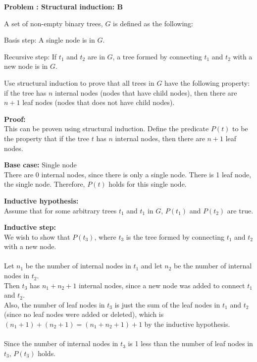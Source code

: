 \documentclass[leqno]{article}
\numberwithin{equation}{section}
\theoremstyle{definition}
\newcounter{parts}
\newcounter{problems}[parts]
\newcommand{\problem}[2]{\stepcounter{problems}
  {\Large \bf \noindent Problem \arabic{problems}: #1 \marginpar{[Total #2 pts]} \\[0.3cm]}}
\begin{document}
\pagebreak

\problem{Structural induction: B}{15}

A set of non-empty binary trees, $G$ is defined as the following:

Basis step: A single node is in $G$.

Recursive step: If $t_1$ and $t_2$ are in $G$, a tree formed by connecting $t_1$ and $t_2$ with a new node is in $G$.

Use structural induction to prove that all trees in $G$ have the following property: if the tree has $n$ internal nodes (nodes that have child nodes), then there are $n+1$ leaf nodes (nodes that does not have child nodes).

\bigskip

\textbf{Proof:}\\
This can be proven using structural induction. Define the predicate $P(t)$ to be the property that if the tree $t$ has $n$ internal nodes, then there are $n+1$ leaf nodes.

\bigskip

\textbf{Base case:} Single node\\
There are 0 internal nodes, since there is only a single node. There is 1 leaf node, the single node. Therefore, $P(t)$ holds for this single node.

\bigskip

\textbf{Inductive hypothesis:}\\
Assume that for some arbitrary trees $t_1$ and $t_1$ in $G$, $P(t_1)$ and $P(t_2)$ are true.

\bigskip

\textbf{Inductive step:}\\
We wish to show that $P(t_3)$, where $t_3$ is the tree formed by connecting $t_1$ and $t_2$ with a new node.\\
\,\\
Let $n_1$ be the number of internal nodes in $t_1$ and let $n_2$ be the number of internal nodes in $t_2$.\\
Then $t_3$ has $n_1+n_2+1$ internal nodes, since a new node was added to connect $t_1$ and $t_2$.\\
Also, the number of leaf nodes in $t_3$ is just the sum of the leaf nodes in $t_1$ and $t_2$ (since no leaf nodes were added or deleted), which is $(n_1 + 1) + (n_2 + 1) = (n_1 + n_2 + 1) + 1$ by the inductive hypothesis.\\
\,\\
Since the number of internal nodes in $t_3$ is 1 less than the number of leaf nodes in $t_3$, $P(t_3)$ holds.
\end{document}
